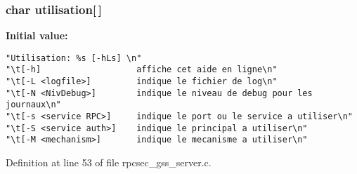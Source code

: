 \subsubsection{\setlength{\rightskip}{0pt plus 5cm}char {\bf utilisation}[$\,$]}\label{rpcsec__gss__server_8c_a13}


{\bf Initial value:}

\footnotesize\begin{verbatim} 
"Utilisation: %s [-hLs] \n"
"\t[-h]                   affiche cet aide en ligne\n"
"\t[-L <logfile>]         indique le fichier de log\n"
"\t[-N <NivDebug>]        indique le niveau de debug pour les journaux\n" 
"\t[-s <service RPC>]     indique le port ou le service a utiliser\n" 
"\t[-S <service auth>]    indique le principal a utiliser\n"
"\t[-M <mechanism>]       indique le mecanisme a utiliser\n"
\end{verbatim}\normalsize 


Definition at line 53 of file rpcsec\_\-gss\_\-server.c.